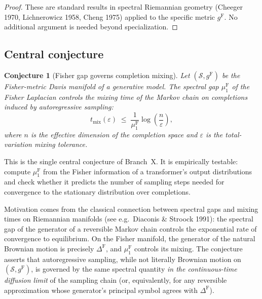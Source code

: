 \documentclass[11pt]{article}
\newcommand{\gF}{g^{\mathrm{F}}}
\newtheorem{conjecture}{Conjecture}
\theoremstyle{remark}
\begin{document}
\begin{proof}
These are standard results in spectral Riemannian geometry
(Cheeger 1970, Lichnerowicz 1958, Cheng 1975) applied to the specific metric
$\gF$.  No additional argument is needed beyond specialization.
\end{proof}

\subsection{Central conjecture}

\begin{mdframed}[backgroundcolor=gray!10, linewidth=0.4pt]
\begin{conjecture}[Fisher gap governs completion mixing]
\label{conj:fisher-mixing}
Let $(\mathcal{S}, \gF)$ be the Fisher-metric Davis manifold of a generative
model.  The spectral gap $\mu_1^{\mathrm{F}}$ of the Fisher Laplacian controls
the mixing time of the Markov chain on completions induced by autoregressive
sampling:
\begin{equation}\label{eq:mixing-bound}
t_{\mathrm{mix}}(\varepsilon)
\;\le\;
\frac{1}{\mu_1^{\mathrm{F}}}
\log\!\left(\frac{n}{\varepsilon}\right),
\end{equation}
where $n$ is the effective dimension of the completion space and $\varepsilon$
is the total-variation mixing tolerance.
\end{conjecture}
\end{mdframed}

This is the single central conjecture of Branch~X.  It is empirically testable:
compute $\mu_1^{\mathrm{F}}$ from the Fisher information of a transformer's
output distributions and check whether it predicts the number of sampling steps
needed for convergence to the stationary distribution over completions.

Motivation comes from the classical connection between spectral gaps and mixing
times on Riemannian manifolds (see e.g.\ Diaconis \& Stroock 1991): the
spectral gap of the generator of a reversible Markov chain controls the
exponential rate of convergence to equilibrium.  On the Fisher manifold, the
generator of the natural Brownian motion is precisely $\Delta^{\mathrm{F}}$,
and $\mu_1^{\mathrm{F}}$ controls its mixing.  The conjecture asserts that
autoregressive sampling, while not literally Brownian motion on
$(\mathcal{S}, \gF)$, is governed by the same spectral quantity
\emph{in the continuous-time diffusion limit} of the sampling chain
(or, equivalently, for any reversible approximation whose generator's
principal symbol agrees with $\Delta^{\mathrm{F}}$).
\end{document}
